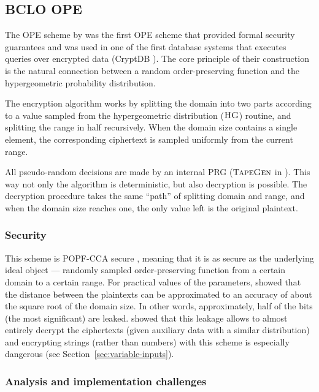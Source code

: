 \subsection{BCLO OPE}

	The OPE scheme by \textcite{bclo-ope} was the first OPE scheme that provided formal security guarantees and was used in one of the first database systems that executes queries over encrypted data (CryptDB \cite{crypt-db}).
 	The core principle of their construction is the natural connection between a random order-preserving function and the hypergeometric probability distribution.

	The encryption algorithm works by splitting the domain into two parts according to a value sampled from the hypergeometric distribution ($\textsc{HG}$) routine, and splitting the range in half recursively.
	When the domain size contains a single element, the corresponding ciphertext is sampled uniformly from the current range.

	All pseudo-random decisions are made by an internal PRG ($\textsc{TapeGen}$ in \cite{bclo-ope}).
	This way not only the algorithm is deterministic, but also decryption is possible.
	The decryption procedure takes the same ``path'' of splitting domain and range, and when the domain size reaches one, the only value left is the original plaintext.

	\subsubsection{Security}
		This scheme is POPF-CCA secure \cite{bclo-ope}, meaning that it is as secure as the underlying ideal object --- randomly sampled order-preserving function from a certain domain to a certain range.
		For practical values of the parameters, \textcite{ope-leakage} showed that the distance between the plaintexts can be approximated to an accuracy of about the square root of the domain size.
		In other words, approximately, half of the bits (the most significant) are leaked.
		\textcite{leakage-abuse-grubs-2017} showed that this leakage allows to almost entirely decrypt the ciphertexts (given auxiliary data with a similar distribution) and encrypting strings (rather than numbers) with this scheme is especially dangerous (see Section~\ref{sec:variable-inputs}).

	\subsubsection{Analysis and implementation challenges}

